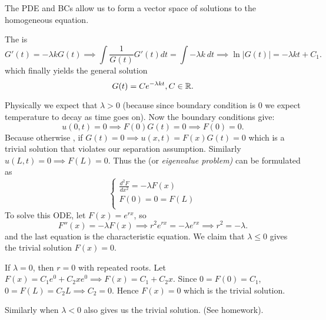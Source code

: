 \documentclass[class=article,crop=false]{standalone}
\begin{document}
\begin{intuition}
	The PDE and BCs allow us to form a vector space of solutions to the homogeneous equation.
\end{intuition}

The  is 
\[
	G'(t)=-\lambda k G(t) \implies \int \frac{1}{G(t)} G'(t) dt = \int -\lambda k\ dt \implies \ln|G(t)|=-\lambda kt + C_1
.\]
which finally yields the general solution
\[
	G(t) = Ce^{-\lambda k t}, C \in \mathbb{R}
.\]

Physically we expect that $ \lambda>0$ (because since boundary condition is 0 we expect temperature to decay as time goes on). Now the boundary conditions give:
\[
	u(0,t)=0 \implies F(0) G(t) = 0 \implies F(0) = 0
.\] 
Because otherwise , if $ G(t)=0 \implies u(x,t)=F(x)G(t)=0$ which is a trivial solution that violates our separation assumption. Similarly $ u(L,t)=0 \implies F(L)=0$. Thus the  (or \emph{eigenvalue problem)} can be formulated as
\begin{equation*}
\begin{cases}
	\frac{d^2 F}{d { x }^2} =-\lambda F(x) \\
	F(0) = 0 = F(L)\\
\end{cases}
\end{equation*}
To solve this ODE, let $ F(x)=e^{rx}$, so
\[
	F''(x)=-\lambda F(x) \implies r^2e^{rx}=-\lambda e^{rx} \implies r^2=-\lambda
.\] 
and the last equation is the characteristic equation. We claim that $ \lambda \leq 0$ gives the trivial solution $ F(x)=0$. 
\begin{prf}
\begin{case}[1]
	If $ \lambda = 0$, then $ r=0$ with repeated roots. Let  $ F(x) = C_1 e^{0} + C_2 x e^{0} \implies F(x) = C_1+C_2x$. Since $ 0=F(0)=C_1$, $ 0=F(L) =C_2 L \implies C_2=0$. Hence $ F(x)=0$ which is the trivial solution.
\end{case}
\begin{case}[2]
	Similarly when $ \lambda<0$ also gives us the trivial solution. (See homework).
\end{case}
\end{prf}
\end{document}
